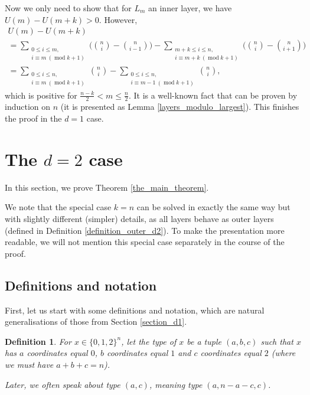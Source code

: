 \documentclass[11pt, reqno]{amsart}
\newtheorem{definition}[theorem]{Definition}
\numberwithin{equation}{section}
\newcommand\modd{\operatorname{mod}}
\begin{document}
Now we only need to show that for $L_m$ an inner layer, we have $U(m)-U(m+k)>0$. However,
\begin{multline}
    U(m)-U(m+k)\\
    =\sum_{\substack{0 \leqslant i \leqslant m, \\ i \equiv m \ (\modd k+1)}} \bigg( \binom{n}{i} - \binom{n}{i-1}\bigg) - \sum_{\substack{m+k \leqslant i \leqslant n, \\ i \equiv m+k \ (\modd k+1)}} \bigg( \binom{n}{i} - \binom{n}{i+1}\bigg)\\
    =\sum_{\substack{0 \leqslant i \leqslant n, \\ i \equiv m \ (\modd k+1)}} \binom{n}{i} - \sum_{\substack{0 \leqslant i \leqslant n, \\ i \equiv m-1 \ (\modd k+1)}} \binom{n}{i},
\end{multline}
which is positive for $\frac{n-k}{2} < m \leqslant \frac{n}{2}$. It is a well-known fact that can be proven by induction on $n$ (it is presented as Lemma \ref{layers_modulo_largest}). This finishes the proof in the $d=1$ case.

\section{The \texorpdfstring{$d=2$}{d=2} case}
\label{section_d2_overview}
In this section, we prove Theorem \ref{the_main_theorem}.

We note that the special case $k=n$ can be solved in exactly the same way but with slightly different (simpler) details, as all layers behave as outer layers (defined in Definition \ref{definition_outer_d2}). To make the presentation more readable, we will not mention this special case separately in the course of the proof.

\subsection{Definitions and notation}

First, let us start with some definitions and notation, which are natural generalisations of those from Section \ref{section_d1}.

\begin{definition}
    For $x \in \{0, 1, 2\}^n$, let the \emph{type} of $x$ be a tuple $(a, b, c)$ such that $x$ has $a$ coordinates equal $0$, $b$ coordinates equal $1$ and $c$ coordinates equal $2$ (where we must have $a+b+c=n$).

    Later, we often speak about \emph{type $(a, c)$,} meaning type $(a, n-a-c, c)$.
\end{definition}
\end{document}
